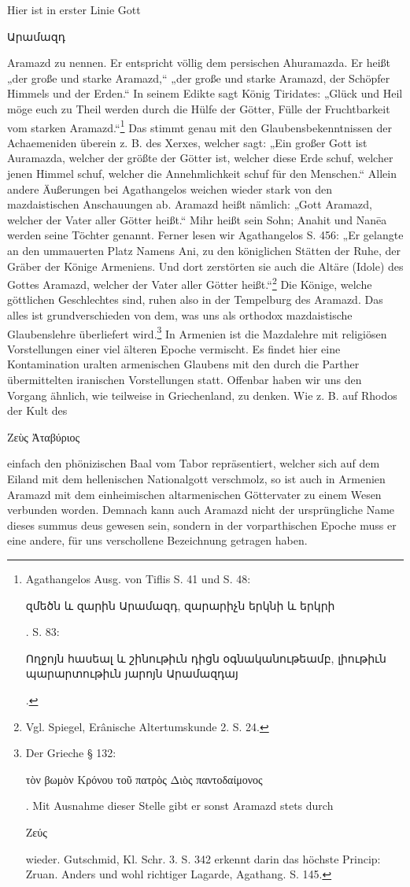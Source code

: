 \documentclass{article}
\begin{document}
Hier ist in erster Linie Gott \begin{armenian}Արամազդ\end{armenian} Aramazd zu nennen. Er entspricht völlig dem persischen Ahuramazda. Er heißt „der große und starke Aramazd,“ „der große und starke Aramazd, der Schöpfer Himmels und der Erden.“ In seinem Edikte sagt König Tiridates: „Glück und Heil möge euch zu Theil werden durch die Hülfe der Götter, Fülle der Fruchtbarkeit vom starken Aramazd.“\footnote{Agathangelos Ausg. von Tiflis S. 41 und S. 48: \begin{armenian}զմեծն և զարին Արամազդ, զարարիչն երկնի և երկրի\end{armenian}. S. 83: \begin{armenian}Ողջոյն հասեալ և շինութիւն դիցն օգնականութեամբ, լիութիւն պարարտութիւն յարոյն Արամազդայ\end{armenian}.} Das stimmt genau mit den Glaubensbekenntnissen der Achaemeniden überein z. B. des Xerxes, welcher sagt: „Ein großer Gott ist Auramazda, welcher der größte der Götter ist, welcher diese Erde schuf, welcher jenen Himmel schuf, welcher die Annehmlichkeit schuf für den Menschen.“ Allein andere Äußerungen bei Agathangelos weichen wieder stark von den mazdaistischen Anschauungen ab. Aramazd heißt nämlich: „Gott Aramazd, welcher der Vater aller Götter heißt.“ Mihr heißt sein Sohn; Anahit und Nanēa werden seine Töchter genannt. Ferner lesen wir Agathangelos S. 456: „Er gelangte an den ummauerten Platz Namens Ani, zu den königlichen Stätten der Ruhe, der Gräber der Könige Armeniens. Und dort zerstörten sie auch die Altäre (Idole) des Gottes Aramazd, welcher der Vater aller Götter heißt.“\footnote{Vgl. Spiegel, Erânische Altertumskunde 2. S. 24.} Die Könige, welche göttlichen Geschlechtes sind, ruhen also in der Tempelburg des Aramazd. Das alles ist grundverschieden von dem, was uns als orthodox mazdaistische Glaubenslehre überliefert wird.\footnote{Der Grieche § 132: \begin{greek}τὸν βωμὸν Κρόνου τοῦ πατρὸς Διὸς παντοδαίμονος\end{greek}. Mit Ausnahme dieser Stelle gibt er sonst Aramazd stets durch \begin{greek}Ζεύς\end{greek} wieder. Gutschmid, Kl. Schr. 3. S. 342 erkennt darin das höchste Princip: Zruan. Anders und wohl richtiger Lagarde, Agathang. S. 145.} In Armenien ist die Mazdalehre mit religiösen Vorstellungen einer viel älteren Epoche vermischt. Es findet hier eine Kontamination uralten armenischen Glaubens mit den durch die Parther übermittelten iranischen Vorstellungen statt. Offenbar haben wir uns den Vorgang ähnlich, wie teilweise in Griechenland, zu denken. Wie z. B. auf Rhodos der Kult des \begin{greek}Ζεὺς Ἀταβύριος\end{greek} einfach den phönizischen Baal vom Tabor repräsentiert, welcher sich auf dem Eiland mit dem hellenischen Nationalgott verschmolz, so ist auch in Armenien Aramazd mit dem einheimischen altarmenischen Göttervater zu einem Wesen verbunden worden. Demnach kann auch Aramazd nicht der ursprüngliche Name dieses summus deus gewesen sein, sondern in der vorparthischen Epoche muss er eine andere, für uns verschollene Bezeichnung getragen haben.
\end{document}
